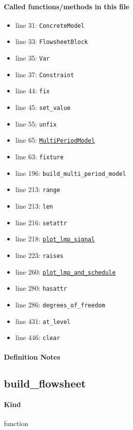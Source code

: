 \documentclass[11pt]{report}
\begin{document}
\paragraph{Called functions/methods in this file}
\begin{itemize}[leftmargin=*]
  \item line 31: \texttt{ConcreteModel}
  \item line 33: \texttt{FlowsheetBlock}
  \item line 35: \texttt{Var}
  \item line 37: \texttt{Constraint}
  \item line 44: \texttt{fix}
  \item line 45: \texttt{set\_value}
  \item line 55: \texttt{unfix}
  \item line 65: \hyperref[def:multiperiod-multiperiod.py:MultiPeriodModel:L24]{\texttt{MultiPeriodModel}}
  \item line 63: \texttt{fixture}
  \item line 196: \texttt{build\_multi\_period\_model}
  \item line 213: \texttt{range}
  \item line 213: \texttt{len}
  \item line 216: \texttt{setattr}
  \item line 218: \hyperref[def:multiperiod-multiperiod.py:MultiPeriodModel.plot_lmp_signal:L493]{\texttt{plot\_lmp\_signal}}
  \item line 223: \texttt{raises}
  \item line 260: \hyperref[def:multiperiod-multiperiod.py:MultiPeriodModel.plot_lmp_and_schedule:L597]{\texttt{plot\_lmp\_and\_schedule}}
  \item line 280: \texttt{hasattr}
  \item line 286: \texttt{degrees\_of\_freedom}
  \item line 431: \texttt{at\_level}
  \item line 446: \texttt{clear}
\end{itemize}
\paragraph{Definition Notes}
\subsection{build\_flowsheet}
\label{def:multiperiod-tests-test_multiperiod.py:build_flowsheet:L28}
\paragraph{Kind} function
\end{document}
